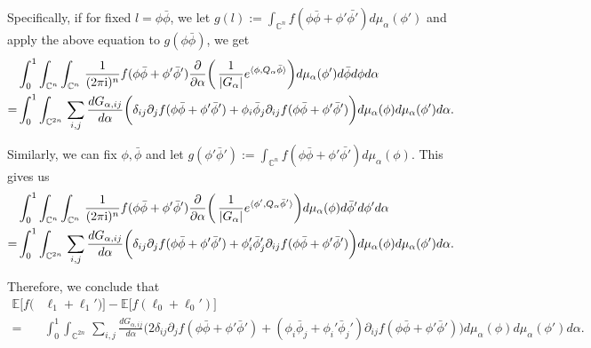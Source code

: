 \documentclass[a4paper, 11pt]{article}
\newcommand{\E}{\mathbb{E}}
\newcommand{\compi}{\textnormal{i}}
\begin{document}
Specifically, if for fixed $l=\phi\bar{\phi}$, we let $g(l):=\int_{\mathbb{C}^n}f(\phi\bar{\phi}+\phi'\bar{\phi'})d\mu_\alpha(\phi')$ and apply the above equation to $g(\phi\bar{\phi})$, we get
\begin{equation*}
\begin{aligned}
& \int_0^1\int_{\mathbb{C}^n}\int_{\mathbb{C}^n}\,
\frac{1}{(2\pi \compi)^n}f(\phi\bar{\phi}+\phi'\bar{\phi}') \frac{\partial}{\partial \alpha}\bigg(\, \frac{1}{|G_\alpha|}e^{\langle \phi,Q_{\alpha}\bar{\phi} \rangle} \bigg)d\mu_\alpha(\phi')
d\bar{\phi} d\phi d\alpha \\
=&\int_0^1\int_{\mathbb{C}^{2n}}\,
\sum_{i,j}\frac{d G_{\alpha,ij}}{d\alpha}\bigg(  \delta_{ij}\partial_j f(\phi\bar{\phi}+\phi'\bar{\phi}') + \phi_i\bar{\phi}_j\partial_{ij} f(\phi\bar{\phi}+\phi'\bar{\phi}') \bigg)
d\mu_\alpha(\phi)d\mu_\alpha(\phi')d\alpha.
\end{aligned}
\end{equation*}

Similarly, we can fix $\phi,\bar{\phi}$ and let $g(\phi'\bar{\phi}'):=\int_{\mathbb{C}^n}f(\phi\bar{\phi}+\phi'\bar{\phi'})d\mu_\alpha(\phi)$. This gives us
\begin{equation*}
\begin{aligned}
& \int_0^1\int_{\mathbb{C}^n}\int_{\mathbb{C}^n}\,
\frac{1}{(2\pi \compi)^n}f(\phi\bar{\phi}+\phi'\bar{\phi}') \frac{\partial}{\partial \alpha}\bigg(\, \frac{1}{|G_\alpha|}e^{\langle \phi',Q_{\alpha}\bar{\phi}'\rangle} \bigg)d\mu_\alpha(\phi)
d\bar{\phi}' d\phi' d\alpha \\
=&\int_0^1\int_{\mathbb{C}^{2n}}\,
\sum_{i,j}\frac{d G_{\alpha,ij}}{d\alpha}\bigg(  \delta_{ij}\partial_j f(\phi\bar{\phi}+\phi'\bar{\phi}') + \phi_i'\bar{\phi}_j'\partial_{ij} f(\phi\bar{\phi}+\phi'\bar{\phi}') \bigg)
d\mu_\alpha(\phi)d\mu_\alpha(\phi')d\alpha.
\end{aligned}
\end{equation*}

Therefore, we conclude that
\begin{equation*}
\begin{aligned}
\E\big[f(& \ell_1 +\ell_1')\big]-\E\big[f(\ell_0+\ell_0')\big]\\
=&\int_0^1\int_{\mathbb{C}^{2n}}\,
\sum_{i,j}\frac{d G_{\alpha,ij}}{d\alpha}\bigg(  2\delta_{ij}\partial_j f(\phi\bar{\phi}+\phi'\bar{\phi}') + (\phi_i\bar{\phi}_j+\phi_i'\bar{\phi}_j')\partial_{ij} f(\phi\bar{\phi}+\phi'\bar{\phi}') \bigg)
d\mu_\alpha(\phi)d\mu_\alpha(\phi')d\alpha.
\end{aligned}
\end{equation*}
\end{document}
